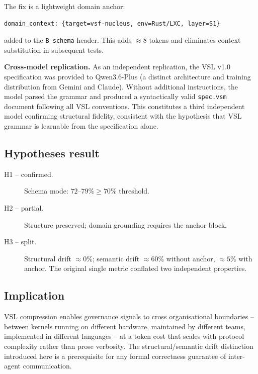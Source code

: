 \documentclass[11pt, a4paper]{article}
\begin{document}
The fix is a lightweight domain anchor:

\begin{verbatim}
domain_context: {target=vsf-nucleus, env=Rust/LXC, layer=S1}
\end{verbatim}

\noindent added to the \texttt{B\_schema} header.
This adds $\approx 8$ tokens and eliminates context substitution in
subsequent tests.

\textbf{Cross-model replication.}
As an independent replication, the VSL v1.0 specification was provided to
Qwen3.6-Plus (a distinct architecture and training distribution from Gemini
and Claude).
Without additional instructions, the model parsed the grammar and produced
a syntactically valid \texttt{spec.vsm} document following all VSL
conventions.
This constitutes a third independent model confirming structural fidelity,
consistent with the hypothesis that VSL grammar is learnable from the
specification alone.

\subsection{Hypotheses result}

\begin{description}
  \item[H1 -- confirmed.]  Schema mode: $72$--$79\% \geq 70\%$ threshold.
  \item[H2 -- partial.]    Structure preserved; domain grounding requires
        the anchor block.
  \item[H3 -- split.]      Structural drift $\approx 0\%$;
        semantic drift $\approx 60\%$ without anchor, $\approx 5\%$ with
        anchor.  The original single metric conflated two independent
        properties.
\end{description}

\subsection{Implication}

VSL compression enables governance signals to cross organisational
boundaries -- between kernels running on different hardware, maintained
by different teams, implemented in different languages -- at a token cost
that scales with protocol complexity rather than prose verbosity.
The structural/semantic drift distinction introduced here is a prerequisite
for any formal correctness guarantee of inter-agent communication.
\end{document}
